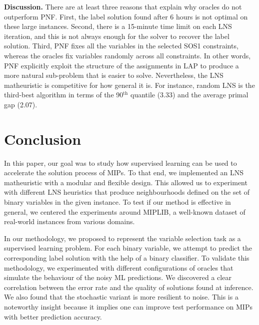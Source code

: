\documentclass[3p, authoryear, times]{elsarticle}
\begin{document}
\textbf{Discussion. } 
There are at least three reasons that explain why oracles do not outperform PNF. First, the label solution found after 6 hours is not optimal on these large instances. Second, there is a 15-minute time limit on each LNS iteration, and this is not always enough for the solver to recover the label solution. Third, PNF fixes all the variables in the selected SOS1 constraints, whereas the oracles fix variables randomly across all constraints.  In other words, PNF explicitly exploit the structure of the assignments in LAP to produce a more natural sub-problem that is easier to solve.  Nevertheless, the LNS matheuristic is competitive for how general it is. For instance, random LNS is the third-best algorithm in terms of the 90$^{\text{th}}$ quantile (3.33) and the average primal gap (2.07). 


\section{Conclusion} \label{sec:lns:conclusion}

In this paper, our goal was to study how supervised learning can be used to accelerate the solution process of MIPs. To that end, we implemented an LNS matheuristic with a modular and flexible design. This allowed us to experiment with different LNS heuristics that produce neighbourhoods defined on the set of binary variables in the given instance. To test if our method is effective in general, we centered the experiments around MIPLIB, a well-known dataset of real-world instances from various domains. 

In our methodology, we proposed to represent the variable selection task as a supervised learning problem. For each binary variable, we attempt to predict the corresponding label solution with the help of a binary classifier. To validate this methodology, we experimented with different configurations of oracles that simulate the behaviour of the noisy ML predictions. We discovered a clear correlation between the error rate and the quality of solutions found at inference. We also found that the stochastic variant is more resilient to noise. This is a noteworthy insight because it implies one can improve test performance on MIPs with better prediction accuracy. 
\end{document}
